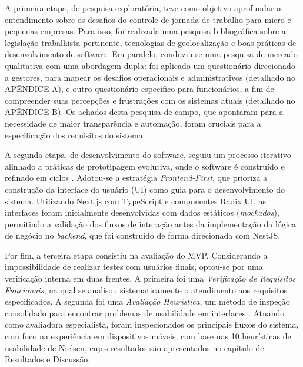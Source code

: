 A primeira etapa, de pesquisa exploratória, teve como objetivo aprofundar o entendimento sobre os desafios do controle de jornada de trabalho para micro e pequenas empresas. Para isso, foi realizada uma pesquisa bibliográfica sobre a legislação trabalhista pertinente, tecnologias de geolocalização e boas práticas de desenvolvimento de software. Em paralelo, conduziu-se uma pesquisa de mercado qualitativa com uma abordagem dupla: foi aplicado um questionário direcionado a gestores, para mapear os desafios operacionais e administrativos (detalhado no APÊNDICE A), e outro questionário específico para funcionários, a fim de compreender suas percepções e frustrações com os sistemas atuais (detalhado no APÊNDICE B). Os achados desta pesquisa de campo, que apontaram para a necessidade de maior transparência e automação, foram cruciais para a especificação dos requisitos do sistema.

A segunda etapa, de desenvolvimento do software, seguiu um processo iterativo alinhado a práticas de prototipagem evolutiva, onde o software é construído e refinado em ciclos \cite{sommerville2011software}. Adotou-se a estratégia \textit{Frontend-First}, que prioriza a construção da interface do usuário (UI) como guia para o desenvolvimento do sistema. Utilizando Next.js com TypeScript e componentes Radix UI, as interfaces foram inicialmente desenvolvidas com dados estáticos (\textit{mockados}), permitindo a validação dos fluxos de interação antes da implementação da lógica de negócio no \textit{backend}, que foi construído de forma direcionada com NestJS.

Por fim, a terceira etapa consistiu na avaliação do MVP. Considerando a impossibilidade de realizar testes com usuários finais, optou-se por uma verificação interna em duas frentes. A primeira foi uma \textit{Verificação de Requisitos Funcionais}, na qual se analisou sistematicamente o atendimento aos requisitos especificados. A segunda foi uma \textit{Avaliação Heurística}, um método de inspeção consolidado para encontrar problemas de usabilidade em interfaces \cite{Nielsen1994}. Atuando como avaliadora especialista, foram inspecionados os principais fluxos do sistema, com foco na experiência em dispositivos móveis, com base nas 10 heurísticas de usabilidade de Nielsen, cujos resultados são apresentados no capítulo de Resultados e Discussão.